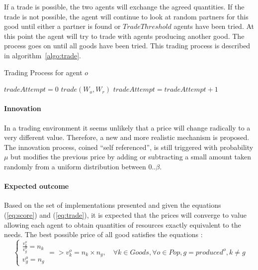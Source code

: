 \documentclass{wscpaperproc}
\begin{document}
If a trade is possible, the two agents will exchange the agreed quantities. If the trade is not possible, the agent will continue to look at random partners for this good until either a partner is found or $TradeThreshold$ agents have been tried. At this point the agent will try to trade with agents producing another good. The process goes on until all goods have been tried. This trading process is described in algorithm~\ref{algo:trade}.

\begin{algorithm}
\caption{Trading Process for agent $o$}
\label{algo:trade}
	\begin{algorithmic}[1]
	\scriptsize
			\State $tradeAttempt = 0$
					\State $trade(W_o,W_r)$
				\Else
					\State $tradeAttempt = tradeAttempt + 1$					
				\EndIf
			\EndFor
		\EndFor
\end{algorithmic}
\end{algorithm}


\paragraph{Innovation} In a trading environment it seems unlikely that a price will change radically to a very different value. Therefore, a new and more realistic mechanism is proposed. The innovation process, coined ``self referenced'', is still triggered with probability $\mu$ 
but modifies the previous price by adding or subtracting a small amount taken randomly from a uniform  distribution between $0 .. \beta$.


\paragraph{Expected outcome} Based on the set of implementations presented and given the equations (\ref{eq:score}) and (\ref{eq:trade}), it is expected that the prices will converge to value allowing each agent to obtain quantities of resources exactly equivalent to the needs. The best possible price of all good satisfies the equations :
\begin{equation}
	\begin{cases}
		\frac{v^o_k}{v^o_g} = n_k \\
		v^o_g = n_g 
	\end{cases} =>v^o_k = n_k \times n_g, \quad \forall k \in Goods, \forall o \in Pop, g = produced^o, k \not= g 
\end{equation}
\end{document}
